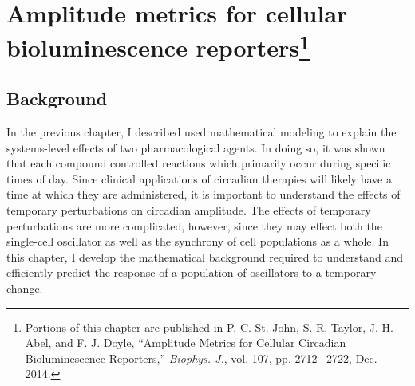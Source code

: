 \chapter[Amplitude metrics for cellular bioluminescence reporters]{Amplitude metrics for cellular bioluminescence reporters\footnote{Portions of this chapter are published in P. C. St. John, S. R. Taylor, J. H. Abel, and F. J. Doyle, ``Amplitude Metrics for Cellular Circadian Bioluminescence Reporters,'' {\itshape Biophys. J.}, vol. 107, pp. 2712– 2722, Dec. 2014.}}\label{chap:arc}

\section{Background}

In the previous chapter, I described used mathematical modeling to explain the systems-level effects of two pharmacological agents. 
In doing so, it was shown that each compound controlled reactions which primarily occur during specific times of day. 
Since clinical applications of circadian therapies will likely have a time at which they are administered, it is important to understand the effects of temporary perturbations on circadian amplitude. 
The effects of temporary perturbations are more complicated, however, since they may effect both the single-cell oscillator as well as the synchrony of cell populations as a whole.
In this chapter, I develop the mathematical background required to understand and efficiently predict the response of a population of oscillators to a temporary change.

